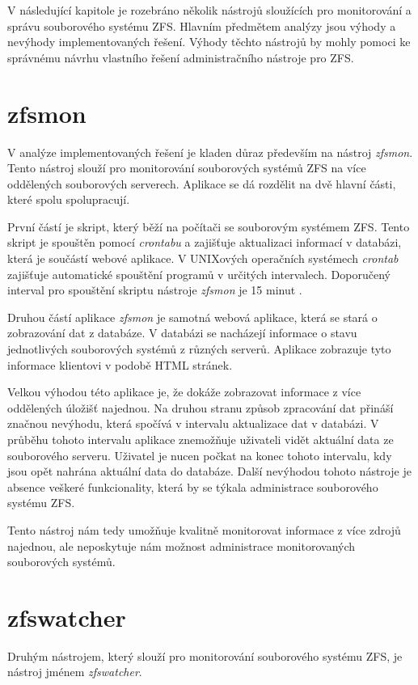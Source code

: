 V následující kapitole je rozebráno několik nástrojů sloužících pro monitorování a správu souborového systému ZFS. Hlavním předmětem analýzy jsou výhody a nevýhody implementovaných řešení. Výhody těchto nástrojů by mohly pomoci ke správnému návrhu vlastního řešení administračního nástroje pro ZFS.
\section{zfsmon}
V analýze implementovaných řešení je kladen důraz především na nástroj \emph{zfsmon}. Tento nástroj slouží pro monitorování souborových systémů ZFS na více oddělených souborových serverech. Aplikace se dá rozdělit na dvě hlavní části, které spolu spolupracují.

První částí je skript, který běží na počítači se souborovým systémem ZFS. Tento skript je spouštěn pomocí \emph{crontabu} a zajišťuje aktualizaci informací v databázi, která je součástí webové aplikace. V UNIXových operačních systémech \emph{crontab} zajišťuje automatické spouštění programů v určitých intervalech. Doporučený interval pro spouštění skriptu nástroje \emph{zfsmon} je 15 minut \cite{zfsmon}.

Druhou částí aplikace \emph{zfsmon} je samotná webová aplikace, která se stará o zobrazování dat z databáze. V databázi se nacházejí informace o stavu jednotlivých souborových systémů z různých serverů. Aplikace zobrazuje tyto informace klientovi v podobě HTML stránek.

Velkou výhodou této aplikace je, že dokáže zobrazovat informace z více oddělených úložišť najednou. Na druhou stranu způsob zpracování dat přináší značnou nevýhodu, která spočívá v intervalu aktualizace dat v databázi. V průběhu tohoto intervalu aplikace znemožňuje uživateli vidět aktuální data ze souborového serveru. Uživatel je nucen počkat na konec tohoto intervalu, kdy jsou opět nahrána aktuální data do databáze. Další nevýhodou tohoto nástroje je absence veškeré funkcionality, která by se týkala administrace souborového systému ZFS.

Tento nástroj nám tedy umožňuje kvalitně monitorovat informace z více zdrojů najednou, ale neposkytuje nám možnost administrace monitorovaných souborových systémů.
\section{zfswatcher}
Druhým nástrojem, který slouží pro monitorování souborového systému ZFS, je nástroj jménem \emph{zfswatcher}.

